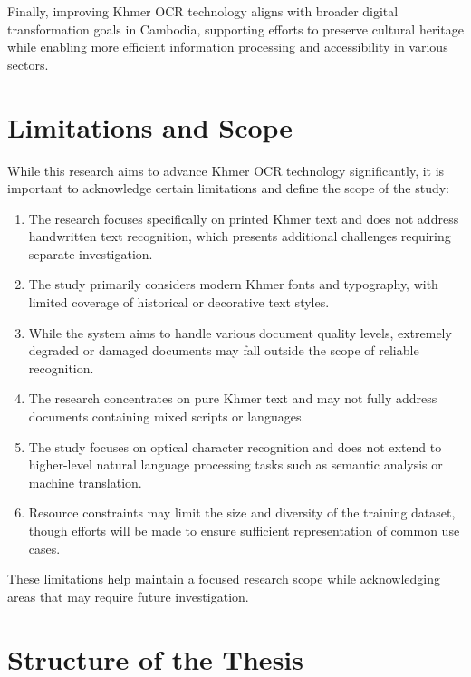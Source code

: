 Finally, improving Khmer OCR technology aligns with broader digital transformation goals in Cambodia, supporting efforts to preserve cultural heritage while enabling more efficient information processing and accessibility in various sectors.

\section{Limitations and Scope}
\label{sec:limitations}

While this research aims to advance Khmer OCR technology significantly, it is important to acknowledge certain limitations and define the scope of the study:

\begin{enumerate}
    \item The research focuses specifically on printed Khmer text and does not address handwritten text recognition, which presents additional challenges requiring separate investigation.
    
    \item The study primarily considers modern Khmer fonts and typography, with limited coverage of historical or decorative text styles.
    
    \item While the system aims to handle various document quality levels, extremely degraded or damaged documents may fall outside the scope of reliable recognition.
    
    \item The research concentrates on pure Khmer text and may not fully address documents containing mixed scripts or languages.
    
    \item The study focuses on optical character recognition and does not extend to higher-level natural language processing tasks such as semantic analysis or machine translation.
    
    \item Resource constraints may limit the size and diversity of the training dataset, though efforts will be made to ensure sufficient representation of common use cases.
\end{enumerate}

These limitations help maintain a focused research scope while acknowledging areas that may require future investigation.

\section{Structure of the Thesis}
\label{sec:structure}

